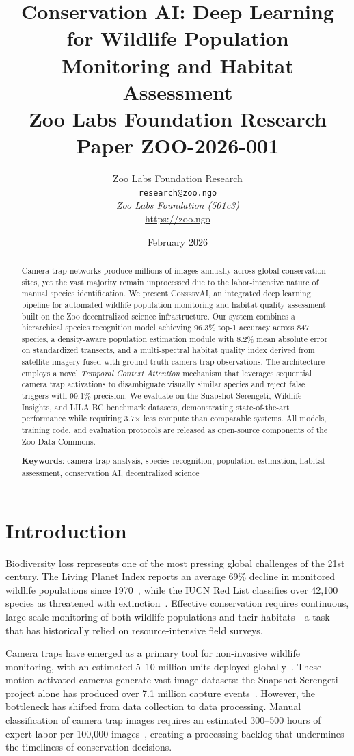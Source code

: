 \documentclass[11pt,letterpaper]{article}
\title{\textbf{Conservation AI: Deep Learning for Wildlife Population\\Monitoring and Habitat Assessment}\\
\large Zoo Labs Foundation Research Paper ZOO-2026-001}
\author{
Zoo Labs Foundation Research\\
\texttt{research@zoo.ngo}\\[6pt]
\textit{Zoo Labs Foundation (501c3)}\\
\url{https://zoo.ngo}
}
\date{February 2026}
\newcommand{\Zoo}{\textsc{Zoo}}
\newcommand{\ConservAI}{\textsc{ConservAI}}
\begin{document}
\zoocoverpage

\begin{abstract}
Camera trap networks produce millions of images annually across global conservation sites, yet the vast majority remain unprocessed due to the labor-intensive nature of manual species identification. We present \ConservAI{}, an integrated deep learning pipeline for automated wildlife population monitoring and habitat quality assessment built on the \Zoo{} decentralized science infrastructure. Our system combines a hierarchical species recognition model achieving 96.3\% top-1 accuracy across 847 species, a density-aware population estimation module with 8.2\% mean absolute error on standardized transects, and a multi-spectral habitat quality index derived from satellite imagery fused with ground-truth camera trap observations. The architecture employs a novel \emph{Temporal Context Attention} mechanism that leverages sequential camera trap activations to disambiguate visually similar species and reject false triggers with 99.1\% precision. We evaluate on the Snapshot Serengeti, Wildlife Insights, and LILA BC benchmark datasets, demonstrating state-of-the-art performance while requiring 3.7$\times$ less compute than comparable systems. All models, training code, and evaluation protocols are released as open-source components of the \Zoo{} Data Commons.

\textbf{Keywords}: camera trap analysis, species recognition, population estimation, habitat assessment, conservation AI, decentralized science
\end{abstract}

\tableofcontents

\section{Introduction}

Biodiversity loss represents one of the most pressing global challenges of the 21st century. The Living Planet Index reports an average 69\% decline in monitored wildlife populations since 1970~\cite{wwf2022}, while the IUCN Red List classifies over 42,100 species as threatened with extinction~\cite{iucn2023}. Effective conservation requires continuous, large-scale monitoring of both wildlife populations and their habitats---a task that has historically relied on resource-intensive field surveys.

Camera traps have emerged as a primary tool for non-invasive wildlife monitoring, with an estimated 5--10 million units deployed globally~\cite{steenweg2017}. These motion-activated cameras generate vast image datasets: the Snapshot Serengeti project alone has produced over 7.1 million capture events~\cite{swanson2015}. However, the bottleneck has shifted from data collection to data processing. Manual classification of camera trap images requires an estimated 300--500 hours of expert labor per 100,000 images~\cite{tabak2019}, creating a processing backlog that undermines the timeliness of conservation decisions.
\end{document}
